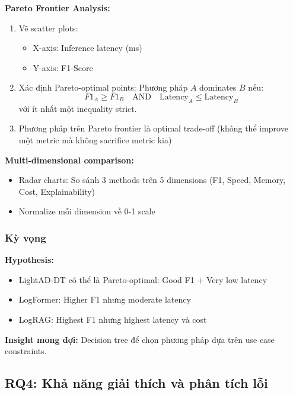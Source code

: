 \textbf{Pareto Frontier Analysis:}

\begin{enumerate}
    \item Vẽ scatter plots: 
    \begin{itemize}
        \item X-axis: Inference latency (ms)
        \item Y-axis: F1-Score
    \end{itemize}
    
    \item Xác định Pareto-optimal points: Phương pháp $A$ dominates $B$ nếu:
    \[
    F1_A \geq F1_B \quad \text{AND} \quad \text{Latency}_A \leq \text{Latency}_B
    \]
    với ít nhất một inequality strict.
    
    \item Phương pháp trên Pareto frontier là optimal trade-off (không thể improve một metric mà không sacrifice metric kia)
\end{enumerate}

\textbf{Multi-dimensional comparison:}
\begin{itemize}
    \item Radar charts: So sánh 3 methods trên 5 dimensions (F1, Speed, Memory, Cost, Explainability)
    \item Normalize mỗi dimension về 0-1 scale
\end{itemize}

\subsubsection{Kỳ vọng}

\textbf{Hypothesis:}
\begin{itemize}
    \item LightAD-DT có thể là Pareto-optimal: Good F1 + Very low latency
    \item LogFormer: Higher F1 nhưng moderate latency
    \item LogRAG: Highest F1 nhưng highest latency và cost
\end{itemize}

\textbf{Insight mong đợi:} Decision tree để chọn phương pháp dựa trên use case constraints.

\subsection{RQ4: Khả năng giải thích và phân tích lỗi}
\label{subsec:rq4}

